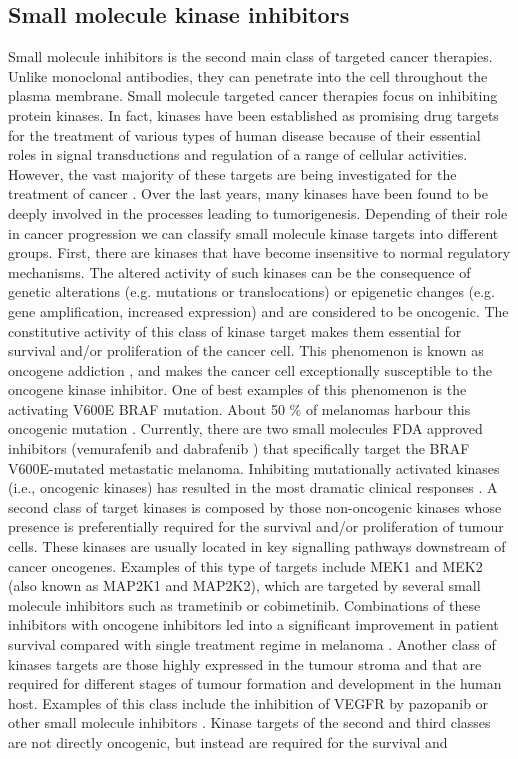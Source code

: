 \documentclass[12pt, a4paper,twoside]{tesi_upf}
\begin{document}
\subsection{Small molecule kinase inhibitors}

\par Small molecule inhibitors is the second main class of targeted cancer therapies.  Unlike monoclonal antibodies, they can penetrate into the cell throughout the plasma membrane. Small molecule targeted cancer therapies focus on inhibiting protein kinases. In fact, kinases have been established as promising drug targets for the treatment of various types of human disease because of their essential roles in signal transductions and regulation of a range of cellular activities. However, the vast majority of these targets are being investigated for the treatment of cancer \cite{Zhang2009}.  Over the last years,  many kinases have been found to be deeply involved in the processes leading to tumorigenesis. Depending of their role in cancer progression we can classify small molecule kinase targets into different groups.  First, there are kinases that have become insensitive to normal regulatory mechanisms. The altered activity of such kinases can be the consequence of genetic alterations (e.g. mutations or translocations) or epigenetic changes (e.g. gene amplification, increased expression) and are considered to be oncogenic. The constitutive activity of this class of kinase target makes them essential for survival and/or proliferation of the cancer cell. This phenomenon is known as oncogene addiction \cite{Weinstein2006}, and makes the cancer cell exceptionally susceptible to the oncogene kinase inhibitor. One of best examples of this phenomenon is the activating V600E BRAF mutation. About 50 $\%$ of melanomas harbour this oncogenic mutation \cite{Ascierto2012}. Currently, there are two small molecules FDA approved inhibitors (vemurafenib \cite{Bollag2010} and dabrafenib \cite{Gibney2013}) that specifically target the BRAF V600E-mutated metastatic melanoma. Inhibiting mutationally activated kinases (i.e., oncogenic kinases) has resulted in the most dramatic clinical responses \cite{Zhang2009}.  A second class of target kinases is composed by those non-oncogenic kinases whose presence is preferentially required for the survival and/or proliferation of tumour cells.  These kinases are usually located in key signalling pathways downstream of cancer oncogenes. Examples of this type of targets include MEK1 and MEK2 (also known as MAP2K1 and MAP2K2), which are targeted by several small molecule inhibitors such as trametinib or cobimetinib. Combinations of these inhibitors with oncogene inhibitors led into a significant improvement in patient survival compared with single treatment regime in melanoma \cite{Flaherty2012, Flaherty2012a}. Another class of kinases targets are those highly expressed in the tumour stroma and that are required for different stages of tumour formation and development in the human host. Examples of this class include the inhibition of VEGFR by pazopanib or other small molecule inhibitors \cite{Ivy2009}. Kinase targets of the second and third classes are not directly oncogenic, but instead are required for the survival and 
\end{document}
